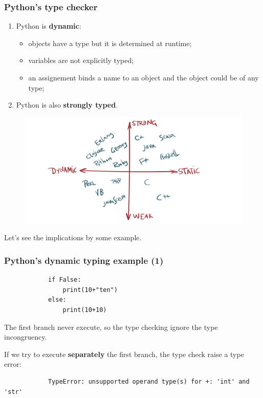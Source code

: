 \documentclass[xcolor ={table,usenames,dvipsnames}]{beamer}
\theoremstyle{definition}
\begin{document}
	\begin{frame}
		\frametitle{Python's type checker}
			\begin{enumerate}
				\item Python is \textbf{dynamic}: 
				\begin{itemize}
					\item objects have a type but it is determined at runtime;
					\item variables are not explicitly typed;
					\item an assignement binds a name to an object and the object could be of any type;
				\end{itemize}
				\item Python is also \textbf{strongly typed}.
			\end{enumerate}
			\begin{figure}[h!]
				\centering
				\includegraphics[scale=0.14]{img/classification.png}
			\end{figure}
			Let's see the implications by some example.
	\end{frame}

	\begin{frame}[fragile]
		\frametitle{Python's dynamic typing example (1)}
			\begin{lstlisting} 
			if False:
				print(10+"ten") 
			else:
				print(10+10)
			\end{lstlisting}
			The first branch never execute, so the type checking ignore the type incongruency.
			
			If we try to execute \textbf{separately} the first branch, the type check raise a type error:
			
			\begin{lstlisting}
			TypeError: unsupported operand type(s) for +: 'int' and 'str'
			\end{lstlisting}
	\end{frame}
\end{document}
